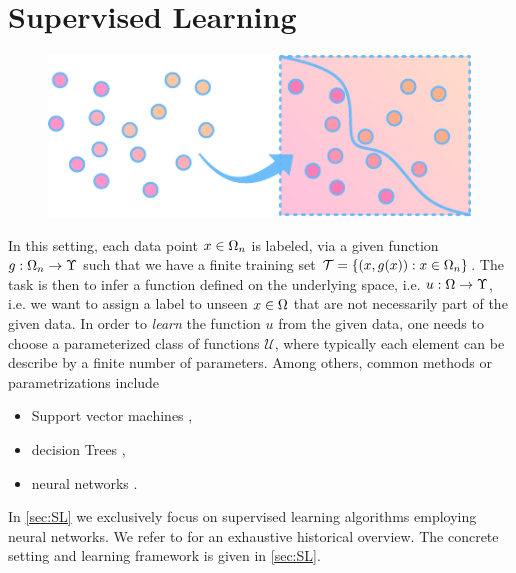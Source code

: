 \section{Supervised Learning}\label{sec:PSL}
\begin{figure}
\centering
\includegraphics[width=.5\textwidth]{atelier/paradigms/SL.pdf}
\end{figure}
%
In this setting, each data point $x\in\Omega_n$ is labeled, via a given function $g:\Omega_n\to\Upsilon$ such that we have a finite training set $\mathcal{T} = \{(x,g(x)): x\in\Omega_n\}$. The task is then to infer a function defined on the underlying space, i.e. $u:\Omega \to\Upsilon$, i.e. we want to assign a label to unseen $x\in\Omega$ that are not necessarily part of the given data. In order to \emph{learn} the function $u$ from the given data, one needs to choose a parameterized class of functions $\mathcal{U}$, where typically each element can be describe by a finite number of parameters. Among others, common methods or parametrizations include
%
\begin{itemize}
\item Support vector machines \cite{cortes1995support, scholkopf2005support},
\item decision Trees \cite{morgan1963problems, Brei},
\item neural networks \cite{Turing,rosenblatt1958perceptron, minsky1969introduction}.
\end{itemize}
%
In \cref{sec:SL} we exclusively focus on supervised learning algorithms employing neural networks. We refer to \cite{SCHMIDHUBER201585} for an exhaustive historical overview. The concrete setting and learning framework is given in \cref{sec:SL}.
%
%
%
